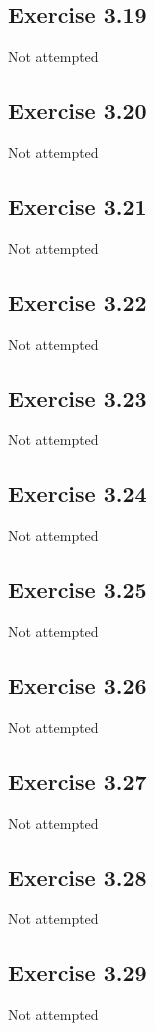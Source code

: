 \subsection{Exercise 3.19}
Not attempted

\subsection{Exercise 3.20}
Not attempted

\subsection{Exercise 3.21}
Not attempted

\subsection{Exercise 3.22}
Not attempted

\subsection{Exercise 3.23}
Not attempted

\subsection{Exercise 3.24}
Not attempted

\subsection{Exercise 3.25}
Not attempted

\subsection{Exercise 3.26}
Not attempted

\subsection{Exercise 3.27}
Not attempted

\subsection{Exercise 3.28}
Not attempted

\subsection{Exercise 3.29}
Not attempted

